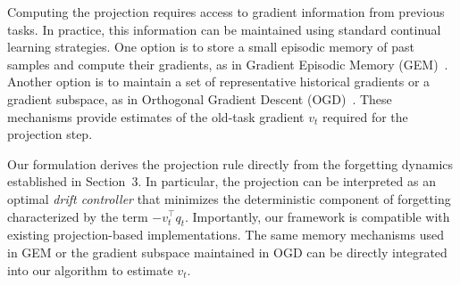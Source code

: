 \documentclass{article}
\begin{document}
Computing the projection requires access to gradient information from previous tasks. In practice, this information can be maintained using standard continual learning strategies. One option is to store a small episodic memory of past samples and compute their gradients, as in Gradient Episodic Memory (GEM)~\cite{lopez-pazGradientEpisodicMemory2017}. Another option is to maintain a set of representative historical gradients or a gradient subspace, as in Orthogonal Gradient Descent (OGD)~\cite{farajtabarOrthogonalGradientDescent2020}. These mechanisms provide estimates of the old-task gradient $v_t$ required for the projection step.


Our formulation derives the projection rule directly from the forgetting dynamics established in Section~3. In particular, the projection can be interpreted as an optimal \emph{drift controller} that minimizes the deterministic component of forgetting characterized by the term $-v_t^\top q_t$.
Importantly, our framework is compatible with existing projection-based implementations. The same memory mechanisms used in GEM or the gradient subspace maintained in OGD can be directly integrated into our algorithm to estimate $v_t$.


\end{document}
